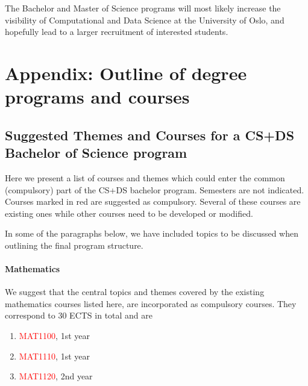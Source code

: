 \documentclass[oneside,final,10pt]{article}
\begin{document}
The Bachelor and Master of Science programs
will most likely increase the visibility of Computational and Data Science at the University of Oslo, and hopefully lead to a larger recruitment of interested students. 










\section*{Appendix:  Outline of degree programs and courses}

\subsection*{Suggested Themes and Courses for a CS+DS Bachelor of Science program}

Here we present a list of courses and themes which could enter the common (compulsory) part of the CS+DS bachelor program.  
Semesters are not indicated. Courses marked in red are suggested as compulsory.
Several of these courses are existing ones while other courses need to be developed or modified. 

In some of the paragraphs below, we have included topics to be discussed when outlining the final program structure. 

\paragraph{Mathematics}
We suggest that the central topics and themes covered by the existing mathematics courses listed here, are incorporated as compulsory courses. They correspond to 
30 ECTS in total and are
\begin{enumerate}
\color{red}
    \item \textcolor{red}{MAT1100}, 1st year
    \item \textcolor{red}{MAT1110}, 1st year
    \item \textcolor{red}{MAT1120}, 2nd year
\end{enumerate}
\end{document}
